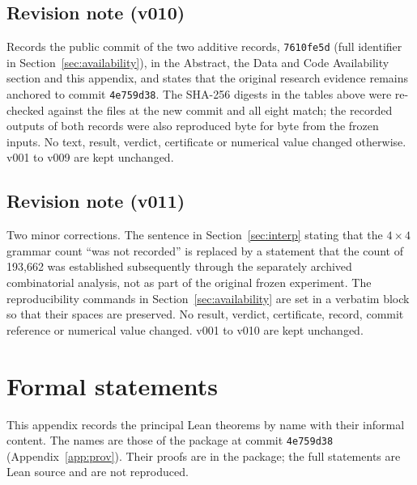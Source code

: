 \documentclass[11pt,a4paper]{article}
\theoremstyle{plain}
\theoremstyle{definition}
\theoremstyle{remark}
\begin{document}
\subsection{Revision note (v010)}
Records the public commit of the two additive records, \texttt{7610fe5d} (full identifier in Section~\ref{sec:availability}), in the Abstract, the Data and Code Availability section and this appendix, and states that the original research evidence remains anchored to commit \texttt{4e759d38}. The SHA-256 digests in the tables above were re-checked against the files at the new commit and all eight match; the recorded outputs of both records were also reproduced byte for byte from the frozen inputs. No text, result, verdict, certificate or numerical value changed otherwise. v001 to v009 are kept unchanged.

\subsection{Revision note (v011)}
Two minor corrections. The sentence in Section~\ref{sec:interp} stating that the $4\times4$ grammar count ``was not recorded'' is replaced by a statement that the count of 193{,}662 was established subsequently through the separately archived combinatorial analysis, not as part of the original frozen experiment. The reproducibility commands in Section~\ref{sec:availability} are set in a verbatim block so that their spaces are preserved. No result, verdict, certificate, record, commit reference or numerical value changed. v001 to v010 are kept unchanged.

\section{Formal statements}\label{app:lean}

This appendix records the principal Lean theorems by name with their informal content. The names are those of the package at commit \texttt{4e759d38} (Appendix~\ref{app:prov}). Their proofs are in the package; the full statements are Lean source and are not reproduced.
\end{document}
